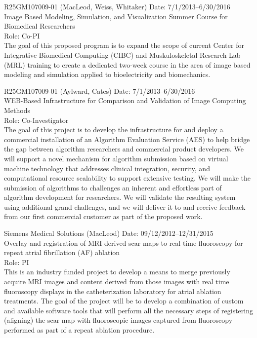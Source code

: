\documentclass[10pt]{article}
\begin{document}
\medskip

\noindent
\parbox{\columnwidth}{
  R25GM107009-01 (MacLeod, Weiss, Whitaker)  Date: 7/1/2013--6/30/2016\\
  Image Based Modeling, Simulation, and Visualization
  Summer Course for Biomedical Researchers\\
  Role: Co-PI\\
  The goal of this proposed program is to expand the scope of current
  Center for Integrative Biomedical Computing (CIBC) and Muskuloskeletal
  Research Lab (MRL) training to create a dedicated two-week course in the
  area of image based modeling and simulation applied to bioelectricity and
  biomechanics.}

\medskip

\noindent
\parbox{\columnwidth}{
  R25GM107009-01 (Aylward, Cates)  Date: 7/1/2013--6/30/2016\\
  WEB-Based Infrastructure for Comparison and
  Validation of Image Computing Methods\\
  Role: Co-Investigator\\
  The goal of this project is to develop the infrastructure for and deploy
  a commercial installation of an Algorithm Evaluation Service (AES) to
  help bridge the gap between algorithm researchers and commercial product
  developers. We will  support a novel
  mechanism for algorithm submission based on virtual machine technology
  that addresses clinical integration, security, and computational resource
  scalability to support extensive testing. We will  make
  the submission of algorithms to  challenges an inherent and effortless
  part of algorithm development for researchers. We will validate
  the resulting system using additional grand challenges, and we will
  deliver it to and receive feedback from our first commercial customer as
  part of the proposed work.}

\medskip

\noindent
\parbox{\columnwidth}{
  Siemens Medical Solutions (MacLeod)  Date: 09/12/2012--12/31/2015\\
  Overlay and registration of MRI-derived scar maps to real-time
  fluoroscopy for repeat atrial fibrillation (AF) ablation\\
  Role: PI\\
  This is an industry funded project to develop a means to merge previously
  acquire MRI images and content derived from those images with real time
  fluoroscopy displays in the catheterization laboratory for atrial
  ablation treatments. The goal of the project will be to develop a
  combination of custom and available software tools that will perform all
  the necessary steps of registering (aligning) the scar map with
  fluoroscopic images captured from fluoroscopy performed as part of a
  repeat ablation procedure.  }
\end{document}
